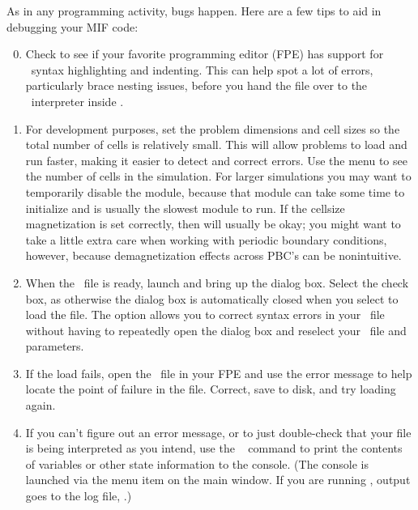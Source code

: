 As in any programming activity, bugs happen. Here are a few tips to aid
in debugging your MIF code:
\begin{enumerate}
\setcounter{enumi}{-1}
\item Check to see if your favorite programming editor (FPE) has support
    for \Tcl\ syntax highlighting and indenting. This can help spot a lot
    of errors, particularly brace nesting issues, before you hand the
    file over to the \Tcl\ interpreter inside \OOMMF.

  \item For development purposes, set the problem dimensions and cell
    sizes so the total number of cells is relatively small. This will
    allow problems to load and run faster, making it easier to detect
    and correct errors. Use the  menu to
    see the number of cells in the simulation. For larger simulations
    you may want to temporarily disable the  module,
    because that module can take some time to initialize and is usually
    the slowest module to run. If the cellsize magnetization is set
    correctly, then  will usually be okay; you might want
    to take a little extra care when working with periodic boundary
    conditions, however, because demagnetization effects across PBC's
    can be nonintuitive.

  \item When the \MIF\ file is ready, launch  and bring up the
     dialog box. Select the  check box, as
    otherwise the  dialog box is automatically closed when you
    select  to load the file. The  option allows you
    to correct syntax errors in your \MIF\ file without having to
    repeatedly open the  dialog box and reselect your
    \MIF\ file and parameters.

  \item If the load fails, open the \MIF\ file in your FPE and use the
    error message to help locate the point of failure in the
    file. Correct, save to disk, and try loading again.

  \item If you can't figure out an error message, or to just
    double-check that your file is being interpreted as you intend, use
    the \MIF\  command to print the contents of variables or
    other state information to the  console. (The 
    console is launched via the  menu item on the
    main  window. If you are running , 
    output goes to the  log file, .)


\end{enumerate}
